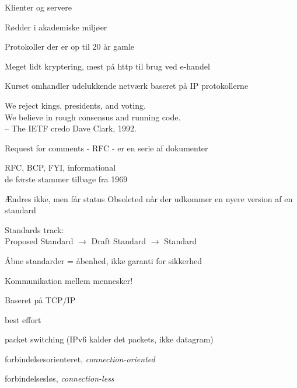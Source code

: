 





\vskip 2cm





\begin{list1}
\item Klienter og servere
\item Rødder i akademiske miljøer
\item Protokoller der er op til 20 år gamle
\item Meget lidt kryptering, mest på http til brug ved e-handel 
\item Kurset omhandler udelukkende netværk baseret på IP protokollerne
\end{list1}


{\hlkbig \color{titlecolor}
We reject kings, presidents, and voting.\\
We believe in rough consensus and running code.\\
-- The IETF credo Dave Clark, 1992.}

\begin{list1}
\item Request for comments - RFC - er en serie af dokumenter
\item RFC, BCP, FYI, informational\\
de første stammer tilbage fra 1969
\item Ændres ikke, men får status Obsoleted når der udkommer en nyere
  version af en standard
\item Standards track:\\
Proposed Standard $\rightarrow$ Draft Standard $\rightarrow$ Standard
\item  Åbne standarder = åbenhed, ikke garanti for sikkerhed
\end{list1}



\begin{list1}
\item Kommunikation mellem mennesker!
\item Baseret på TCP/IP
\begin{list2}
\item best effort
\item packet switching (IPv6 kalder det packets, ikke datagram)
\item forbindelsesorienteret, \emph{connection-oriented}
\item forbindelsesløs, \emph{connection-less}
\end{list2}
\end{list1}

